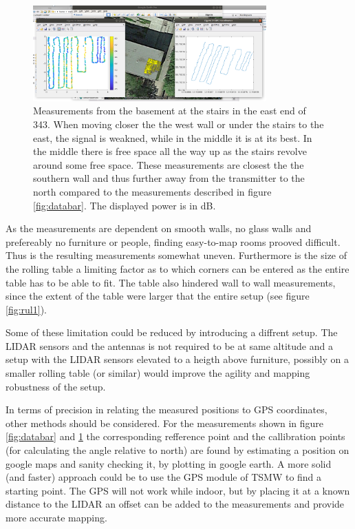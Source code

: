 \documentclass[a4paper,twoside, 12pt]{article}
\begin{document}
\begin{figure}[ht!]
\centering
\includegraphics[width=0.8\textwidth]{stairs.png}
\caption{Measurements from the basement at the stairs in the east end of 343. When moving closer the the west wall or under the stairs to the east, the signal is weakned, while in the middle it is at its best. In the middle there is free space all the way up as the stairs revolve around some free space. These measurements are closest the the southern wall and thus further away from the transmitter to the north compared to the measurements described in figure \ref{fig:databar}. The displayed power is in dB.}
\label{fig:basementEast}
\end{figure}

As the measurements are dependent on smooth walls, no glass walls and prefereably no furniture or people, finding easy-to-map rooms prooved difficult. Thus is the resulting measurements somewhat uneven. Furthermore is the size of the rolling table a limiting factor as to which corners can be entered as the entire table has to be able to fit. The table also hindered wall to wall measurements, since the extent of the table were larger that the entire setup (see figure \ref{fig:rul1}).

Some of these limitation could be reduced by introducing a diffrent setup. The LIDAR sensors and the antennas is not required to be at same altitude and a setup with the LIDAR sensors elevated to a heigth above furniture, possibly on a smaller rolling table (or similar) would improve the agility and mapping robustness of the setup. 

In terms of precision in relating the measured positions to GPS coordinates, other methods should be considered. For the measurements shown in figure \ref{fig:databar} and \ref{fig:basementEast} the corresponding refference point and the callibration points (for calculating the angle relative to north) are found by estimating a position on google maps and sanity checking it, by plotting in google earth. A more solid (and faster) approach could be to use the GPS module of TSMW to find a starting point. The GPS will not work while indoor, but by placing it at a known distance to the LIDAR an offset can be added to the measurements and provide more accurate mapping.
 
\end{document}
